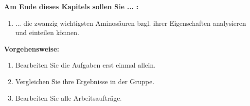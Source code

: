 \documentclass{scrartcl}  %
\begin{document}
		\begin{minipage}{0.7\textwidth}
			\noindent \textbf{Am Ende dieses Kapitels sollen Sie ... :}
			\begin{enumerate}
				\item ... die zwanzig wichtigsten Aminosäuren bzgl. ihrer Eigenschaften analysieren und einteilen können.
			\end{enumerate}
			\textbf{Vorgehensweise:}
			\begin{enumerate}
				\item Bearbeiten Sie die Aufgaben erst einmal allein.
				\item Vergleichen Sie ihre Ergebnisse in der Gruppe.
				\item Bearbeiten Sie alle Arbeitsaufträge.
			\end{enumerate}
			
		\end{minipage}
		\hspace{0.1\textwidth}
\end{document}
